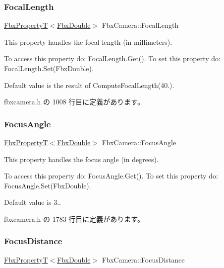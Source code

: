 \mbox{\label{class_fbx_camera_afee5193f8423491a47a059d93cee61c3}} 
\subsubsection{\texorpdfstring{Focal\+Length}{FocalLength}}
{\footnotesize\ttfamily \hyperlink{class_fbx_property_t}{Fbx\+PropertyT}$<$\hyperlink{fbxtypes_8h_a171e72a1c46fc15c1a6c9c31948c1c5b}{Fbx\+Double}$>$ Fbx\+Camera\+::\+Focal\+Length}

This property handles the focal length (in millimeters).

To access this property do\+: Focal\+Length.\+Get(). To set this property do\+: Focal\+Length.\+Set(\+Fbx\+Double).

Default value is the result of Compute\+Focal\+Length(40.). 

 fbxcamera.\+h の 1008 行目に定義があります。

\mbox{\label{class_fbx_camera_af6d282d878bc8ad143c8095e29a4e94a}} 
\subsubsection{\texorpdfstring{Focus\+Angle}{FocusAngle}}
{\footnotesize\ttfamily \hyperlink{class_fbx_property_t}{Fbx\+PropertyT}$<$\hyperlink{fbxtypes_8h_a171e72a1c46fc15c1a6c9c31948c1c5b}{Fbx\+Double}$>$ Fbx\+Camera\+::\+Focus\+Angle}

This property handles the focus angle (in degrees).

To access this property do\+: Focus\+Angle.\+Get(). To set this property do\+: Focus\+Angle.\+Set(\+Fbx\+Double).

Default value is 3.. 

 fbxcamera.\+h の 1783 行目に定義があります。

\mbox{\label{class_fbx_camera_af6165df26c7d25156163a3ed2a2f99c2}} 
\subsubsection{\texorpdfstring{Focus\+Distance}{FocusDistance}}
{\footnotesize\ttfamily \hyperlink{class_fbx_property_t}{Fbx\+PropertyT}$<$\hyperlink{fbxtypes_8h_a171e72a1c46fc15c1a6c9c31948c1c5b}{Fbx\+Double}$>$ Fbx\+Camera\+::\+Focus\+Distance}

